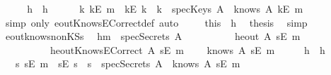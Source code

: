 \begin{isabellebody}
\isamarkupfalse%
\ {\isacharminus}\isanewline
\ \ \isamarkupfalse%
\ h{}\ \ h{}\ \isamarkupfalse%
\ \isanewline
\ \ {\isachardoublequoteopen}{\isacharparenleft}{\isasymexists}\ k{\isachardot}\ {\isacharparenleft}kE\ m{\isacharparenright}\ {\isacharequal}\ {\isacharparenleft}kE\ k{\isacharparenright}\ {\isasymand}\ {\isacharparenleft}k\ {\isasymin}\ specKeys\ A{\isacharparenright}{\isacharparenright}\ {\isasymor}\ {\isacharparenleft}knows\ A\ {\isacharbrackleft}kE\ m{\isacharbrackright}{\isacharparenright}{\isachardoublequoteclose}\isanewline
\ \ \ \ \isamarkupfalse%
\ {\isacharparenleft}simp\ only{\isacharcolon}\ eoutKnowsECorrect{\isacharunderscore}def{\isacharcomma}\ auto{\isacharparenright}\ \isanewline
\ \ \isamarkupfalse%
\ this\ \ h{}\ \isamarkupfalse%
\ {\isacharquery}thesis\ \isamarkupfalse%
\ simp\isanewline
{}\isamarkupfalse%
%
\endisatagproof
{\isafoldproof}%
%
\isadelimproof
\isanewline
%
\endisadelimproof
\isanewline
{}\isamarkupfalse%
\ eout{\isacharunderscore}knows{\isacharunderscore}nonKS{\isacharunderscore}s{\isacharcolon}\isanewline
\ \ h{}{\isacharcolon}{\isachardoublequoteopen}m\ {\isasymnotin}\ specSecrets\ A{\isachardoublequoteclose}\isanewline
\ \ \ \ \ \ \ \ \ \ h{}{\isacharcolon}{\isachardoublequoteopen}eout\ A\ {\isacharparenleft}sE\ m{\isacharparenright}{\isachardoublequoteclose}\isanewline
\ \ \ \ \ \ \ \ \ \ h{}{\isacharcolon}{\isachardoublequoteopen}eoutKnowsECorrect\ A\ {\isacharparenleft}sE\ m{\isacharparenright}{\isachardoublequoteclose}\isanewline
\ \ \ \ {\isachardoublequoteopen}knows\ A\ {\isacharbrackleft}sE\ m{\isacharbrackright}{\isachardoublequoteclose}\isanewline
%
\isadelimproof
%
\endisadelimproof
%
\isatagproof
{}\isamarkupfalse%
\ {\isacharminus}\isanewline
\ \ \isamarkupfalse%
\ h{}\ \ h{}\ \isamarkupfalse%
\ \isanewline
\ \ {\isachardoublequoteopen}{\isacharparenleft}{\isasymexists}\ s{\isachardot}\ {\isacharparenleft}sE\ m{\isacharparenright}\ {\isacharequal}\ {\isacharparenleft}sE\ s{\isacharparenright}\ {\isasymand}\ {\isacharparenleft}s\ {\isasymin}\ specSecrets\ A{\isacharparenright}{\isacharparenright}\ {\isasymor}\ {\isacharparenleft}knows\ A\ {\isacharbrackleft}sE\ m{\isacharbrackright}{\isacharparenright}{\isachardoublequoteclose}\isanewline

\end{isabellebody}
